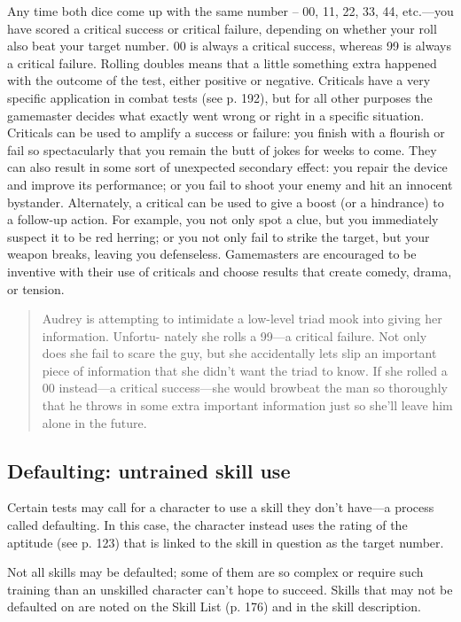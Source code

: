 Any time both dice come up with the same number -- 00, 11, 22, 33, 44,
etc.—you have scored a critical success or critical failure, depending
on whether your roll also beat your target number. 00 is always a
critical success, whereas 99 is always a critical failure.  Rolling
doubles means that a little something extra happened with the outcome
of the test, either positive or negative. Criticals have a very
specific application in combat tests (see p. 192), but for all other
purposes the gamemaster decides what exactly went wrong or right in a
specific situation. Criticals can be used to amplify a success or
failure: you finish with a flourish or fail so spectacularly that you
remain the butt of jokes for weeks to come. They can also result in
some sort of unexpected secondary effect: you repair the device and
improve its performance; or you fail to shoot your enemy and hit an
innocent bystander.  Alternately, a critical can be used to give a
boost (or a hindrance) to a follow-up action. For example, you not
only spot a clue, but you immediately suspect it to be red herring; or
you not only fail to strike the target, but your weapon breaks,
leaving you defenseless. Gamemasters are encouraged to be inventive
with their use of criticals and choose results that create comedy,
drama, or tension.

\begin{quotation}
  Audrey is attempting to intimidate a low-level triad mook into
  giving her information. Unfortu- nately she rolls a 99—a critical
  failure. Not only does she fail to scare the guy, but she
  accidentally lets slip an important piece of information that she
  didn't want the triad to know. If she rolled a 00 instead—a critical
  success—she would browbeat the man so thoroughly that he throws in
  some extra important information just so she'll leave him alone in
  the future.
\end{quotation}

\subsection{Defaulting: untrained skill use}
\label{sec:defa-untr-skill}

Certain tests may call for a character to use a skill they don't
have—a process called defaulting. In this case, the character instead
uses the rating of the aptitude (see p. 123) that is linked to the
skill in question as the target number.

Not all skills may be defaulted; some of them are so complex or
require such training than an unskilled character can't hope to
succeed. Skills that may not be defaulted on are noted on the Skill
List (p. 176) and in the skill description.

